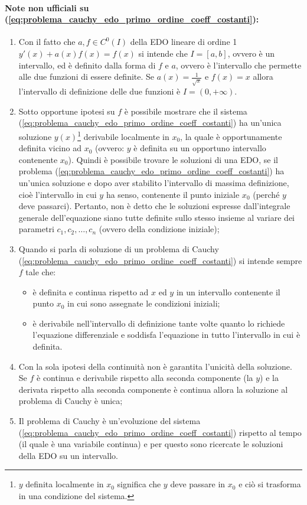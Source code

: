 \paragraph{Note non ufficiali su (\ref{eq:problema_cauchy_edo_primo_ordine_coeff_costanti}):}
\begin{enumerate}
	\item Con il fatto che $a,f\in C^0(I)$ della EDO lineare di ordine 1 $y'(x) + a(x)f(x)=f(x)$ si intende che  $I=[a,b]$, ovvero è un intervallo, ed è definito dalla forma di $f$ e $a$, ovvero è l'intervallo che permette alle due funzioni di essere definite. Se $a(x)=\frac{1}{\sqrt{x}}$ e $f(x)=x$ allora l'intervallo di definizione delle due funzioni è $I=(0, +\infty)$.
    \item Sotto opportune ipotesi su $f$ è possibile mostrare che il sistema (\ref{eq:problema_cauchy_edo_primo_ordine_coeff_costanti}) ha un'unica soluzione $y(x)$\footnote{$y$ definita localmente in $x_0$ significa che $y$ deve passare in $x_0$ e ciò si trasforma in una condizione del sistema.} derivabile localmente in $x_0$, la quale è opportunamente definita vicino ad $x_0$ (ovvero: $y$ è definita su un opportuno intervallo contenente $x_0$). Quindi è possibile trovare le soluzioni di una EDO, se il problema (\ref{eq:problema_cauchy_edo_primo_ordine_coeff_costanti}) ha un'unica soluzione e dopo aver stabilito l'intervallo di massima definizione, cioè l'intervallo in cui $y$ ha senso, contenente il punto iniziale $x_0$ (perché $y$ deve passarci). Pertanto, non è detto che le soluzioni espresse dall'integrale generale dell'equazione siano tutte definite sullo stesso insieme al variare dei parametri $c_1 , c_2 ,\hdots ,c_n$ (ovvero della condizione iniziale);
    \item Quando si parla di soluzione di un problema di Cauchy (\ref{eq:problema_cauchy_edo_primo_ordine_coeff_costanti}) si intende sempre $f$ tale che:
    \begin{itemize}
        \item è definita e continua rispetto ad $x$ ed $y$ in un intervallo contenente il punto $x_0$ in cui sono assegnate le condizioni iniziali;
        \item è derivabile nell'intervallo di definizione tante volte quanto lo richiede l'equazione differenziale e soddisfa l'equazione in tutto l'intervallo in cui è definita.
    \end{itemize}
    \item Con la sola ipotesi della continuità non è garantita l'unicità della soluzione. Se $f$ è continua e derivabile rispetto alla seconda componente (la $y$) e la derivata rispetto alla seconda componente è continua allora la soluzione al problema di Cauchy è unica;
    \item Il problema di Cauchy è un'evoluzione del sistema (\ref{eq:problema_cauchy_edo_primo_ordine_coeff_costanti}) rispetto al tempo (il quale è una variabile continua) e per questo sono ricercate le soluzioni della EDO su un intervallo.
\end{enumerate}

